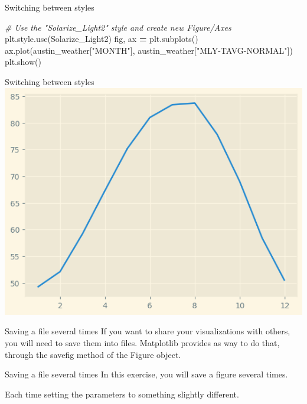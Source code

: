 \documentclass[
  ignorenonframetext,
]{beamer}
\newenvironment{Shaded}{\begin{snugshade}}{\end{snugshade}}
\newcommand{\CommentTok}[1]{\textcolor[rgb]{0.56,0.35,0.01}{\textit{#1}}}
\newcommand{\NormalTok}[1]{#1}
\newcommand{\OperatorTok}[1]{\textcolor[rgb]{0.81,0.36,0.00}{\textbf{#1}}}
\newcommand{\StringTok}[1]{\textcolor[rgb]{0.31,0.60,0.02}{#1}}
\begin{document}
\begin{frame}[fragile]{Switching between styles}
\label{switching-between-styles-4}

\begin{Shaded}
\begin{Highlighting}[]
\CommentTok{\# Use the "Solarize\_Light2" style and create new Figure/Axes}
\NormalTok{plt.style.use(}\StringTok{\textquotesingle{}Solarize\_Light2\textquotesingle{}}\NormalTok{)}
\NormalTok{fig, ax }\OperatorTok{=}\NormalTok{ plt.subplots()}
\NormalTok{ax.plot(austin\_weather[}\StringTok{"MONTH"}\NormalTok{], austin\_weather[}\StringTok{"MLY{-}TAVG{-}NORMAL"}\NormalTok{])}
\NormalTok{plt.show()}
\end{Highlighting}
\end{Shaded}
\end{frame}

\begin{frame}{Switching between styles}
\label{switching-between-styles-5}
\includegraphics{../images/im250.png}
\end{frame}

\begin{frame}{Saving a file several times}
\label{saving-a-file-several-times}
If you want to share your visualizations with others, you will need to
save them into files. Matplotlib provides as way to do that, through the
savefig method of the Figure object.
\end{frame}

\begin{frame}{Saving a file several times}
\label{saving-a-file-several-times-1}
In this exercise, you will save a figure several times.

Each time setting the parameters to something slightly different.
\end{frame}
\end{document}
